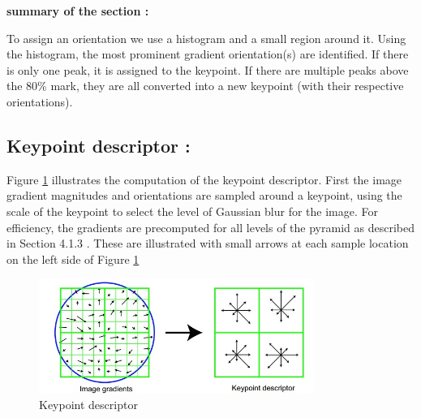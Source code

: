 \textbf{summary of the section :}

To assign an orientation we use a histogram and a small region around it. Using the histogram, the most prominent gradient orientation(s) are identified. If there is only one peak, it is assigned to the keypoint. If there are multiple peaks above the 80\% mark, they are all converted into a new keypoint (with their respective orientations).

\subsection{Keypoint descriptor :}

Figure \ref{fig:sift4} illustrates the computation of the keypoint descriptor. First the image gradient
magnitudes and orientations are sampled around a keypoint, using the scale of the keypoint
to select the level of Gaussian blur for the image. For efficiency, the gradients are precomputed
for all levels of the pyramid as described in Section 4.1.3 . These are illustrated with
small arrows at each sample location on the left side of Figure \ref{fig:sift4}

\begin{figure}[H]
\centering
\includegraphics[width=0.8\textwidth]{img/sift4.jpg}
\caption{ Keypoint descriptor }
\label{fig:sift4}
\end{figure}


